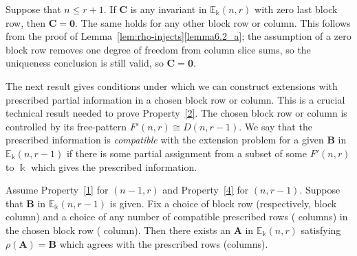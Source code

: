 \documentclass[ALCO,ThmDefs,Unicode,epreuves]{cedram}
\newcommand{\E}{\mathbb{E}}
\newcommand{\bA}{\mathbf{A}}
\newcommand{\bB}{\mathbf{B}}
\newcommand{\bC}{\mathbf{C}}
\newcommand{\bzero}{\mathbf{0}}
\begin{document}
\begin{rema}\label{rmk:sharper}
 Suppose that $n \le r+1$. If $\bC$ is any invariant in
 $\E_\Bbbk(n,r)$ with zero last block row, then $\bC = \bzero$. The
 same holds for any other block row or column. This follows from the
 proof of Lemma~\ref{lem:rho-injects}\ref{lemma6.2_a}; the assumption of a zero
 block row removes one degree of freedom from column slice sums, so
 the uniqueness conclusion is still valid, so $\bC=\bzero$.
\end{rema}

The next result gives conditions under which we can construct
extensions with prescribed partial information in a chosen block row
or column. This is a crucial technical result needed to prove
Property~\ref{2}. The chosen block row or column is controlled by its
free-pattern $F'(n,r) \cong D(n,r-1)$. We say that the prescribed
information is \emph{compatible} with the extension problem for a
given $\bB$ in $\E_\Bbbk(n,r-1)$ if there is some partial assignment
from a subset of some $F'(n,r)$ to $\Bbbk$ which gives the prescribed
information.



\begin{lemm}\label{lem:partial}
Assume Property~\ref{1} for $(n-1,r)$ and Property~\ref{4} for
$(n,r-1)$. Suppose that $\bB$ in $\E_\Bbbk(n,r-1)$ is given. Fix a
choice of block row \textup{(}respectively, block column\textup{)} and
a choice of any number of compatible prescribed rows \textup{(}\resp
columns\textup{)} in the chosen block row \textup{(}\resp
column\textup{)}. Then there exists an $\bA$ in $\E_\Bbbk(n,r)$
satisfying $\rho(\bA)=\bB$ which agrees with the prescribed rows
\textup{(}\resp columns\textup{)}.
\end{lemm}
\end{document}
